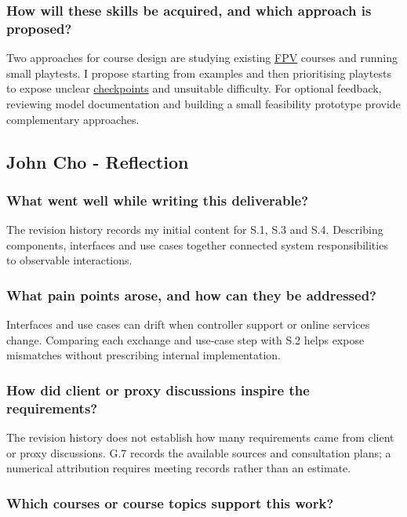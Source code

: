 \documentclass[12pt]{article}
\begin{document}
\subsubsection*{How will these skills be acquired, and which approach is proposed?}

Two approaches for course design are studying existing \hyperlink{glos:FPV}{FPV} courses and running small playtests. I propose starting from examples and then prioritising playtests to expose unclear \hyperlink{glos:Checkpoint}{checkpoints} and unsuitable difficulty. For optional feedback, reviewing model documentation and building a small feasibility prototype provide complementary approaches.

\subsection*{John Cho - Reflection}

\subsubsection*{What went well while writing this deliverable?}

The revision history records my initial content for S.1, S.3 and S.4. Describing components, interfaces and use cases together connected system responsibilities to observable interactions.

\subsubsection*{What pain points arose, and how can they be addressed?}

Interfaces and use cases can drift when controller support or online services change. Comparing each exchange and use-case step with S.2 helps expose mismatches without prescribing internal implementation.

\subsubsection*{How did client or proxy discussions inspire the requirements?}

The revision history does not establish how many requirements came from client or proxy discussions. G.7 records the available sources and consultation plans; a numerical attribution requires meeting records rather than an estimate.

\subsubsection*{Which courses or course topics support this work?}
\end{document}
